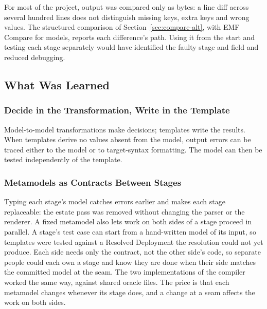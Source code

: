 For most of the project, output was compared only as bytes: a line diff across
several hundred lines does not distinguish missing keys, extra keys and wrong values.
The structured comparison of Section~\ref{sec:compare-alt}, with EMF Compare for
models, reports each difference's path. Using it from the start and testing each stage
separately would have identified the faulty stage and field and reduced debugging.

\subsection{What Was Learned}
\label{sec:learned}

\subsubsection{Decide in the Transformation, Write in the Template}
\label{sec:decide-spell}

Model-to-model transformations make decisions; templates write the results.
When templates derive no values absent from the model, output errors can be traced
either to the model or to target-syntax formatting. The model can then be tested
independently of the template.

\subsubsection{Metamodels as Contracts Between Stages}
\label{sec:contracts}

Typing each stage's model catches errors earlier and makes each stage
replaceable: the estate pass was removed without changing the parser or the
renderer. A fixed metamodel also lets work on both sides of a stage proceed in
parallel. A stage's test case can start from a hand-written model of its input, so
templates were tested against a Resolved Deployment the resolution could not yet
produce. Each side needs only the contract, not the other side's code, so separate
people could each own a stage and know they are done when their side matches the
committed model at the seam. The two implementations of the compiler worked the same
way, against shared oracle files. The price is that each metamodel changes whenever
its stage does, and a change at a seam affects the work on both sides.

